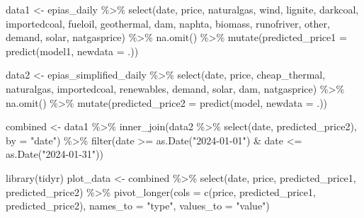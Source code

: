 \documentclass[
  11pt,
  a4paper,
]{article}
\newenvironment{Shaded}{\begin{snugshade}}{\end{snugshade}}
\newcommand{\AttributeTok}[1]{\textcolor[rgb]{0.40,0.45,0.13}{#1}}
\newcommand{\FunctionTok}[1]{\textcolor[rgb]{0.28,0.35,0.67}{#1}}
\newcommand{\NormalTok}[1]{\textcolor[rgb]{0.00,0.23,0.31}{#1}}
\newcommand{\OtherTok}[1]{\textcolor[rgb]{0.00,0.23,0.31}{#1}}
\newcommand{\SpecialCharTok}[1]{\textcolor[rgb]{0.37,0.37,0.37}{#1}}
\newcommand{\StringTok}[1]{\textcolor[rgb]{0.13,0.47,0.30}{#1}}
\begin{document}
\begin{Shaded}
\begin{Highlighting}[]
\NormalTok{data1 }\OtherTok{\textless{}{-}}\NormalTok{ epias\_daily }\SpecialCharTok{\%\textgreater{}\%}
  \FunctionTok{select}\NormalTok{(date, price, naturalgas, wind, lignite, darkcoal, importedcoal, fueloil, geothermal, dam, naphta, biomass, runofriver, other, demand, solar, natgasprice) }\SpecialCharTok{\%\textgreater{}\%}
  \FunctionTok{na.omit}\NormalTok{() }\SpecialCharTok{\%\textgreater{}\%}
  \FunctionTok{mutate}\NormalTok{(}\AttributeTok{predicted\_price1 =} \FunctionTok{predict}\NormalTok{(model1, }\AttributeTok{newdata =}\NormalTok{ .))}

\NormalTok{data2 }\OtherTok{\textless{}{-}}\NormalTok{ epias\_simplified\_daily }\SpecialCharTok{\%\textgreater{}\%}
  \FunctionTok{select}\NormalTok{(date, price, cheap\_thermal, naturalgas, importedcoal, renewables, demand, solar, dam, natgasprice) }\SpecialCharTok{\%\textgreater{}\%}
  \FunctionTok{na.omit}\NormalTok{() }\SpecialCharTok{\%\textgreater{}\%}
  \FunctionTok{mutate}\NormalTok{(}\AttributeTok{predicted\_price2 =} \FunctionTok{predict}\NormalTok{(model, }\AttributeTok{newdata =}\NormalTok{ .))}


\NormalTok{combined }\OtherTok{\textless{}{-}}\NormalTok{ data1 }\SpecialCharTok{\%\textgreater{}\%}
  \FunctionTok{inner\_join}\NormalTok{(data2 }\SpecialCharTok{\%\textgreater{}\%} \FunctionTok{select}\NormalTok{(date, predicted\_price2), }\AttributeTok{by =} \StringTok{"date"}\NormalTok{) }\SpecialCharTok{\%\textgreater{}\%}
  \FunctionTok{filter}\NormalTok{(date }\SpecialCharTok{\textgreater{}=} \FunctionTok{as.Date}\NormalTok{(}\StringTok{"2024{-}01{-}01"}\NormalTok{) }\SpecialCharTok{\&}\NormalTok{ date }\SpecialCharTok{\textless{}=} \FunctionTok{as.Date}\NormalTok{(}\StringTok{"2024{-}01{-}31"}\NormalTok{))}


\FunctionTok{library}\NormalTok{(tidyr)}
\NormalTok{plot\_data }\OtherTok{\textless{}{-}}\NormalTok{ combined }\SpecialCharTok{\%\textgreater{}\%}
  \FunctionTok{select}\NormalTok{(date, price, predicted\_price1, predicted\_price2) }\SpecialCharTok{\%\textgreater{}\%}
  \FunctionTok{pivot\_longer}\NormalTok{(}\AttributeTok{cols =} \FunctionTok{c}\NormalTok{(price, predicted\_price1, predicted\_price2),}
               \AttributeTok{names\_to =} \StringTok{"type"}\NormalTok{, }\AttributeTok{values\_to =} \StringTok{"value"}\NormalTok{)}



\end{Highlighting}
\end{Shaded}
\end{document}

